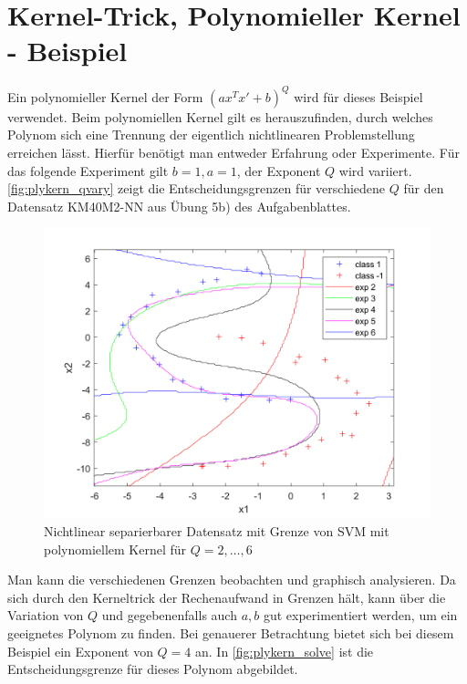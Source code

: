 \documentclass[a4paper,11pt,twoside]{scrreprt}
\begin{document}
\section{Kernel-Trick, Polynomieller Kernel - Beispiel}\label{sec:plykernbsp}
Ein polynomieller Kernel der Form $(a x^{T}x' + b)^{Q}$ wird für dieses Beispiel verwendet.
Beim polynomiellen Kernel gilt es herauszufinden, durch welches Polynom sich eine Trennung der eigentlich nichtlinearen Problemstellung erreichen lässt.
Hierfür benötigt man entweder Erfahrung oder Experimente.
Für das folgende Experiment gilt $b = 1, a = 1$, der Exponent $Q$ wird variiert. %
\autoref{fig:plykern_qvary} zeigt die Entscheidungsgrenzen für verschiedene $Q$ für den Datensatz KM40M2-NN aus Übung 5b) des Aufgabenblattes. %
\begin{figure}[H]
    \centering
    \includegraphics[width = 16cm]{../code/octave/images/kernelexptest}
    \caption{Nichtlinear separierbarer Datensatz mit Grenze von \ac{SVM} mit polynomiellem Kernel für $Q=2,\ldots,6$}
    \label{fig:plykern_qvary}
\end{figure}
Man kann die verschiedenen Grenzen beobachten und graphisch analysieren.
Da sich durch den Kerneltrick der Rechenaufwand in Grenzen hält, kann über die Variation von $Q$ und gegebenenfalls auch $a, b$ gut experimentiert werden, um ein geeignetes Polynom zu finden.
Bei genauerer Betrachtung bietet sich bei diesem Beispiel ein Exponent von $Q=4$ an.
In \autoref{fig:plykern_solve} ist die Entscheidungsgrenze für dieses Polynom abgebildet.
\end{document}

